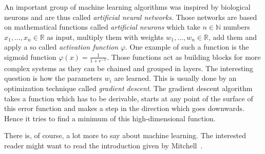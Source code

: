 An important group of machine learning algorithms was inspired by biological
neurons and are thus called \textit{artificial neural networks}. Those networks
are based on mathematical functions called \textit{artificial neurons} which
take $n \in \mathbb{N}$ numbers $x_1, \dots, x_n \in \mathbb{R}$ as input,
multiply them with weights $w_1, \dots, w_n \in \mathbb{R}$, add them and apply
a so called \textit{activation function} $\varphi$. One example of such a
function is the sigmoid function $\varphi(x) = \frac{1}{1+e^{-x}}$. Those
functions act as building blocks for more complex systems as they can be
chained and grouped in layers. The interesting question is how the parameters
$w_i$ are learned. This is usually done by an optimization technique called
\textit{gradient descent}. The gradient descent algorithm takes a function
which has to be derivable, starts at any point of the surface of this error
function and makes a step in the direction which goes downwards. Hence it tries
to find a minimum of this high-dimensional function.

There is, of course, a lot more to say about machine learning. The interested
reader might want to read the introduction given by Mitchell~\cite{Mitchell97}.
